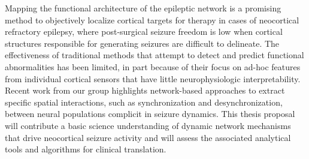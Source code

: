 Mapping the functional architecture of the epileptic network is a promising method to objectively localize cortical targets for therapy in cases of neocortical refractory epilepsy, where post-surgical seizure freedom is low when cortical structures responsible for generating seizures are difficult to delineate. The effectiveness of traditional methods that attempt to detect and predict functional abnormalities has been limited, in part because of their focus on ad-hoc features from individual cortical sensors that have little neurophysiologic interpretability. Recent work from our group highlights network-based approaches to extract specific spatial interactions, such as synchronization and desynchronization, between neural populations complicit in seizure dynamics. This thesis proposal will contribute a basic science understanding of dynamic network mechanisms that drive neocortical seizure activity and will assess the associated analytical tools and algorithms for clinical translation.
